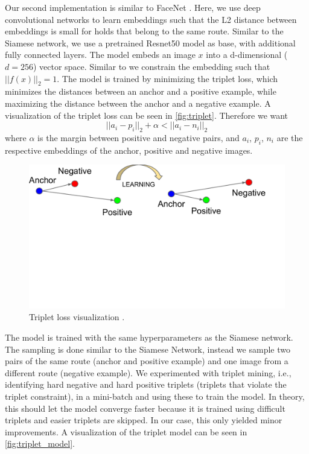\documentclass[final]{cvpr}
\begin{document}
Our second implementation is similar to FaceNet \cite{FaceNet}. Here, we use deep convolutional networks to learn embeddings such that the L2 distance between embeddings is small for holds that belong to the same route. Similar to the Siamese network, we use a pretrained Resnet50 model as base, with additional fully connected layers. The model embeds an image $x$ into a d-dimensional ($d=256$) vector space. Similar to \cite{FaceNet} we constrain the embedding such that $||f(x)||_{2} = 1$.
The model is trained by minimizing the triplet loss, which minimizes the distances between an anchor and a positive example, while maximizing the distance between the anchor and a negative example. A visualization of the triplet loss can be seen in \autoref{fig:triplet}.
Therefore we want
$$||a_{i} - p_{i}||_2 + \alpha < ||a_{i} - n_{i}||_2$$
where $\alpha$ is the margin between positive and negative pairs, and $a_i$, $p_i$, $n_i$ are the respective embeddings of the anchor, positive and negative images.
\begin{figure}
    \centering
    \includegraphics[trim=1cm 10cm 2.5cm 0cm, width = 0.9\linewidth]{img/triplet_viz.pdf}
    \caption{Triplet loss visualization \cite{FaceNet}.}
    \label{fig:triplet}
\end{figure}

The model is trained with the same hyperparameters as the Siamese network.
The sampling is done similar to the Siamese Network, instead we sample two pairs of the same route (anchor and positive example) and one image from a different route (negative example).
We experimented with triplet mining, i.e., identifying hard negative and hard positive triplets (triplets that violate the triplet constraint), in a mini-batch and using these to train the model. In theory, this should let the model converge faster because it is trained using difficult triplets and easier triplets are skipped. In our case, this only yielded minor improvements. A visualization of the triplet model can be seen in \autoref{fig:triplet_model}.
\end{document}

